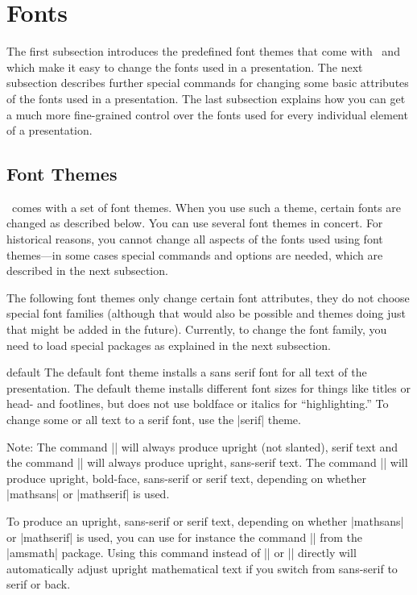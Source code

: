 %
%
%


\section{Fonts}

\label{section-fonts}

The first subsection introduces the predefined font themes that come with \beamer\ and which make it easy to change the fonts used in a presentation. The next subsection describes further special commands for changing some basic attributes of the fonts used in a presentation. The last subsection explains how you can get a much more fine-grained control over the fonts used for every individual element of a presentation.


\subsection{Font Themes}

\beamer\ comes with a set of font themes. When you use such a theme, certain fonts are changed as described below. You can use several font themes in concert. For historical reasons, you cannot change all aspects of the fonts used using font themes---in some cases special commands and options are needed, which are described in the next subsection.

The following font themes only change certain font attributes, they do not choose special font families (although that would also be possible and themes doing just that might be added in the future). Currently, to change the font family, you need to load special packages as explained in the next subsection.


\begin{fontthemeexample}{default}
  The default font theme installs a sans serif font for all text of the presentation. The default theme installs different font sizes for things like titles or head- and footlines, but does not use boldface or italics for ``highlighting.'' To change some or all text to a serif font, use the |serif| theme.

  Note: The command |\mathrm| will always produce upright (not slanted), serif text and the command |\mathsf| will always produce upright, sans-serif text. The command |\mathbf| will produce upright, bold-face, sans-serif or serif text, depending on whether |mathsans| or |mathserif| is used.

  To produce an upright, sans-serif or serif text, depending on whether |mathsans| or |mathserif| is used, you can use for instance the command |\operatorname| from the |amsmath| package. Using this command instead of |\mathrm| or |\mathsf| directly will automatically adjust upright mathematical text if you switch from sans-serif to serif or back.
\end{fontthemeexample}

